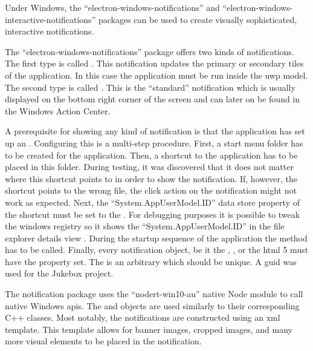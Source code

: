 Under Windows, the \enquote{electron-windows-notifications} \cite{winNot} and \enquote{electron-windows-interactive-notifications} \cite{winIntNot} packages can be used to create visually sophisticated, interactive notifications.

The \enquote{electron-windows-notifications} package offers two kinds of notifications. The first type is called . This notification updates the primary or secondary tiles of the application. In this case the application must be run inside the \gls{uwp} model. The second type is called . This is the \enquote{standard} notification which is usually displayed on the bottom right corner of the screen and can later on be found in the Windows Action Center.

A prerequisite for showing any kind of notification is that the application has set up an . Configuring this  is a multi-step procedure. First, a start menu folder has to be created for the application. Then, a shortcut to the application has to be placed in this folder. During testing, it was discovered that it does not matter where this shortcut points to in order to show the notification. If, however, the shortcut points to the wrong file, the click action on the notification might not work as expected. Next, the \enquote{System.AppUserModel.ID} data store property of the shortcut must be set to the  \cite{eNotWinAppId}. For debugging purposes it is possible to tweak the windows registry so it shows the \enquote{System.AppUserModel.ID} in the file explorer details view \cite{showAppId}. During the startup sequence of the application the  method has to be called. Finally, every notification object, be it the , , or the \gls{html} 5  must have the  property set. The  is an arbitrary  which should be unique. A \gls{guid} was used for the Jukebox project.

The notification package uses the \enquote{nodert-win10-au} native Node module to call native Windows \gls{api}s. The  and  objects are used similarly to their corresponding C++ classes. Most notably, the notifications are constructed using an \gls{xml} template. This template allows for banner images, cropped images, and many more visual elements to be placed in the notification.

